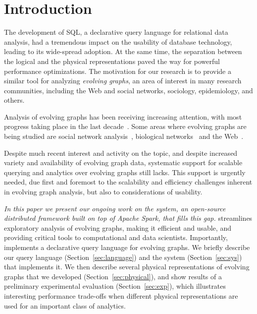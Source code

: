 \section{Introduction}
\label{sec:intro}

The development of SQL, a declarative query language for relational
data analysis, had a tremendous impact on the usability of database
technology, leading to its wide-spread adoption.  At the same time,
the separation between the logical and the physical representations
paved the way for powerful performance optimizations.  The motivation
for our research is to provide a similar tool for analyzing {\em
  evolving graphs}, an area of interest in many research communities,
including the Web and social networks, sociology, epidemiology, and
others.

Analysis of evolving graphs has been receiving increasing attention,
with most progress taking place in the last
decade~\cite{DBLP:journals/csur/AggarwalS14,Chan2008,Kan2009,DBLP:journals/tos/MiaoHLWYZPCC15,Ren2011,Semertzidis2015}.
Some areas where evolving graphs are being studied are social network
analysis~\cite{DBLP:conf/icwsm/GoetzLMF09,DBLP:journals/tweb/LeskovecAH07,DBLP:conf/kdd/LeskovecBKT08,DBLP:conf/icml/SarkarCJ12},
biological
networks~\cite{DBLP:journals/tkdd/AsurPU09,DBLP:journals/tcsb/BeyerTLSF10,Stuart2003}
and the
Web~\cite{DBLP:journals/kais/ChanBL08,DBLP:journals/jisa/PapadimitriouDG10}.

Despite much recent interest and activity on the topic, and despite
increased variety and availability of evolving graph data, systematic
support for scalable querying and analytics over evolving graphs still
lacks. This support is urgently needed, due first and foremost to the
scalability and efficiency challenges inherent in evolving graph
analysis, but also to considerations of usability. 

 {\em In this paper we present our ongoing work on the \ql system, an
   open-source distributed framework built on top of Apache Spark,
   that fills this gap.} \ql streamlines exploratory analysis of
 evolving graphs, making it efficient and usable, and providing
 critical tools to computational and data scientists.  Importantly,
 \ql implements a declarative query language for evolving graphs.  We
 briefly describe our query language (Section~\ref{sec:language}) and
 the system (Section~\ref{sec:sys}) that implements it.  We then
 describe several physical representations of evolving graphs that we
 developed (Section~\ref{sec:physical}), and show results of a
 preliminary experimental evaluation (Section~\ref{sec:exp}), which
 illustrates interesting performance trade-offs when different
 physical representations are used for an important class of
 analytics.  

